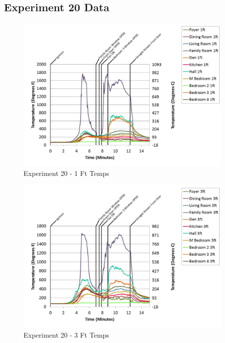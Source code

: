 \documentclass{article}
\begin{document}
\begin{appendices}
	\clearpage

		\clearpage
\clearpage		\large
\subsection{Experiment 20 Data} \label{App:Exp20Results} 

	\begin{figure}[h!]
		\centering
		\includegraphics[height=3.05in]{0_Images/Results_Charts/Exp_20_Charts/1FtTemps.pdf}
		\caption{Experiment 20 - 1 Ft Temps}
	\end{figure}
 

	\begin{figure}[h!]
		\centering
		\includegraphics[height=3.05in]{0_Images/Results_Charts/Exp_20_Charts/3FtTemps.pdf}
		\caption{Experiment 20 - 3 Ft Temps}
	\end{figure}
 
	\clearpage


\end{appendices}
\end{document}
